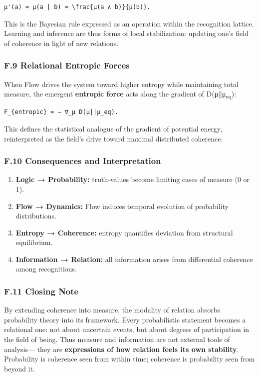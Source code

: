 \documentclass[11pt]{article}
\begin{document}
\begin{verbatim}
μ'(a) = μ(a | b) = \frac{μ(a ∧ b)}{μ(b)}.
\end{verbatim}

This is the Bayesian rule expressed as an operation within the recognition lattice.  
Learning and inference are thus forms of local stabilization:  
updating one’s field of coherence in light of new relations.
\subsubsection*{F.9 Relational Entropic Forces}
\label{sec:org024c258}
When Flow drives the system toward higher entropy while maintaining total measure,  
the emergent \textbf{entropic force} acts along the gradient of D(μ||μ\textsubscript{eq}):  

\begin{verbatim}
F_{entropic} = − ∇_μ D(μ||μ_eq).
\end{verbatim}

This defines the statistical analogue of the gradient of potential energy,  
reinterpreted as the field’s drive toward maximal distributed coherence.
\subsubsection*{F.10 Consequences and Interpretation}
\label{sec:org8448b7f}
\begin{enumerate}
\item \textbf{\textbf{Logic → Probability:}} truth-values become limiting cases of measure (0 or 1).
\item \textbf{\textbf{Flow → Dynamics:}} Flow induces temporal evolution of probability distributions.
\item \textbf{\textbf{Entropy → Coherence:}} entropy quantifies deviation from structural equilibrium.
\item \textbf{\textbf{Information → Relation:}} all information arises from differential coherence among recognitions.
\end{enumerate}
\subsubsection*{F.11 Closing Note}
\label{sec:org1166edc}
By extending coherence into measure,  
the modality of relation absorbs probability theory into its framework.  
Every probabilistic statement becomes a relational one:  
not about uncertain events, but about degrees of participation in the field of being.  
Thus measure and information are not external tools of analysis—  
they are \textbf{expressions of how relation feels its own stability}.  
Probability is coherence seen from within time;  
coherence is probability seen from beyond it.
\end{document}
